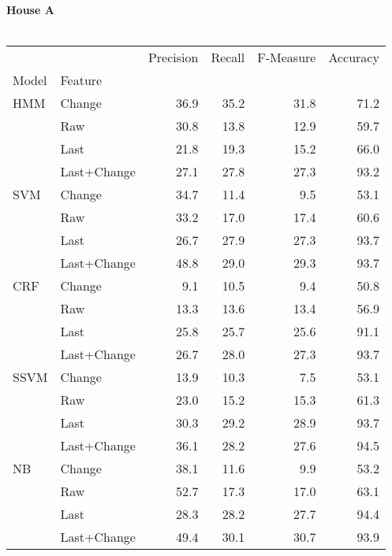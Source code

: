 \documentclass{article}
\begin{document}
\textbf{House A}\\
\vspace{1cm}\\
\begin{tabular}{llrrrr}
\toprule
    &        &  Precision &  Recall &  F-Measure &  Accuracy \\
Model & Feature &            &         &            &           \\
\midrule
HMM & Change &       36.9 &    35.2 &       31.8 &      71.2 \\
    & Raw &       30.8 &    13.8 &       12.9 &      59.7 \\
    & Last &       21.8 &    19.3 &       15.2 &      66.0 \\
    & Last+Change &       27.1 &    27.8 &       27.3 &      93.2 \\
SVM & Change &       34.7 &    11.4 &        9.5 &      53.1 \\
    & Raw &       33.2 &    17.0 &       17.4 &      60.6 \\
    & Last &       26.7 &    27.9 &       27.3 &      93.7 \\
    & Last+Change &       48.8 &    29.0 &       29.3 &      93.7 \\
CRF & Change &        9.1 &    10.5 &        9.4 &      50.8 \\
    & Raw &       13.3 &    13.6 &       13.4 &      56.9 \\
    & Last &       25.8 &    25.7 &       25.6 &      91.1 \\
    & Last+Change &       26.7 &    28.0 &       27.3 &      93.7 \\
SSVM & Change &       13.9 &    10.3 &        7.5 &      53.1 \\
    & Raw &       23.0 &    15.2 &       15.3 &      61.3 \\
    & Last &       30.3 &    29.2 &       28.9 &      93.7 \\
    & Last+Change &       36.1 &    28.2 &       27.6 &      94.5 \\
NB & Change &       38.1 &    11.6 &        9.9 &      53.2 \\
    & Raw &       52.7 &    17.3 &       17.0 &      63.1 \\
    & Last &       28.3 &    28.2 &       27.7 &      94.4 \\
    & Last+Change &       49.4 &    30.1 &       30.7 &      93.9 \\
\bottomrule
\end{tabular}
\vspace{1cm}\\
\end{document}

